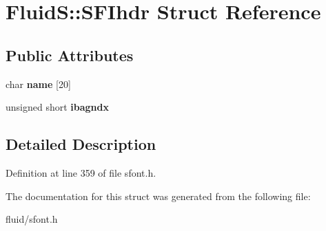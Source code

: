 \hypertarget{struct_fluid_s_1_1_s_f_ihdr}{}\section{FluidS\+:\+:S\+F\+Ihdr Struct Reference}
\label{struct_fluid_s_1_1_s_f_ihdr}
\subsection*{Public Attributes}
\begin{DoxyCompactItemize}
\item 
\mbox{\label{struct_fluid_s_1_1_s_f_ihdr_a567a8e2ac4327acb8fa0b06a0949c2a0}} 
char {\bfseries name} \mbox{[}20\mbox{]}
\item 
\mbox{\label{struct_fluid_s_1_1_s_f_ihdr_a00f3895dd0a9ee407b99933d4ad0da0f}} 
unsigned short {\bfseries ibagndx}
\end{DoxyCompactItemize}


\subsection{Detailed Description}


Definition at line 359 of file sfont.\+h.



The documentation for this struct was generated from the following file\+:\begin{DoxyCompactItemize}
\item 
fluid/sfont.\+h\end{DoxyCompactItemize}
